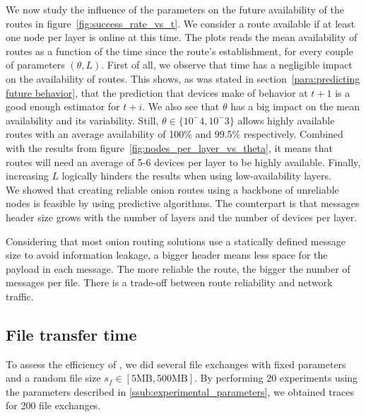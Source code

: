 We now study the influence of the parameters on the future availability of the routes in figure~\ref{fig:success_rate_vs_t}.
We consider a route available if at least one node per layer is online at this time.
The plots reads the mean availability of routes as a function of the time since the route's establishment, for every couple of parameters $(\theta, L)$.
First of all, we observe that time has a negligible impact on the availability of routes. 
This shows, as was stated in section~\ref{para:predicting future behavior}, that the prediction that devices make of behavior at $t+1$ is a good enough estimator for $t+i$.
We also see that $\theta$ has a big impact on the mean availability and its variability.
Still, $\theta\in\{10^-4, 10^-3\}$ allows highly available routes with an average availability of 100\% and 99.5\% respectively.
Combined with the results from figure~\ref{fig:nodes_per_layer_vs_theta}, it means that routes will need an average of 5-6 devices per layer to be highly available.
Finally, increasing $L$ logically hinders the results when using low-availability layers.
\\

We showed that creating reliable onion routes using a backbone of unreliable nodes is feasible by using predictive algorithms.
The counterpart is that messages header size grows with the number of layers and the number of devices per layer.

Considering that most onion routing solutions use a statically defined message size to avoid information leakage, a bigger header means less space for the payload in each message. The more reliable the route, the bigger the number of messages per file. There is a trade-off between route reliability and network traffic.

\subsection{File transfer time} %
\label{sub:file_transfer}

\newcommand{\fsize}{\ensuremath{s_f}}

To assess the efficiency of \name, we did several file exchanges with fixed parameters and a random file size $\fsize\in [5\text{MB}, 500\text{MB}]$. 
By performing 20 experiments using the parameters described in \ref{ssub:experimental_parameters}, we obtained traces for 200 file exchanges.

